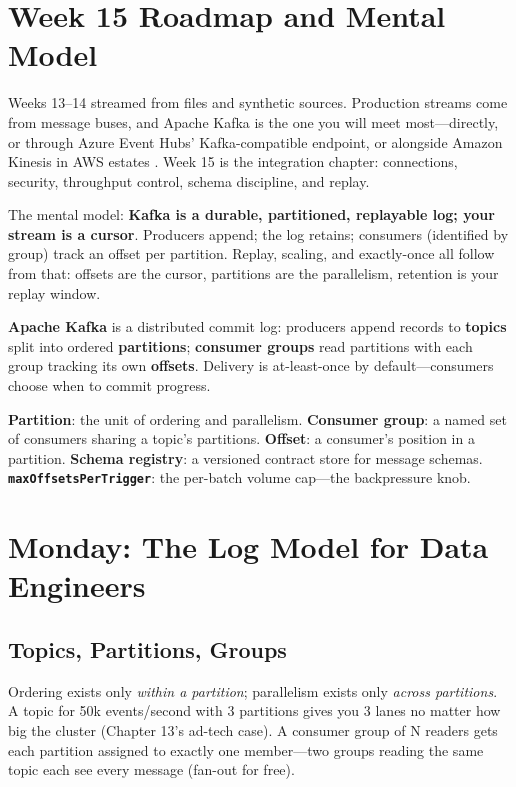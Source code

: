 \section{Week 15 Roadmap and Mental Model}
Weeks 13--14 streamed from files and synthetic sources. Production streams come from message buses, and Apache Kafka is the one you will meet most---directly, or through Azure Event Hubs' Kafka-compatible endpoint, or alongside Amazon Kinesis in AWS estates \cite{kafkaDocs,sparkKafkaIntegration}. Week 15 is the integration chapter: connections, security, throughput control, schema discipline, and replay.

The mental model: \textbf{Kafka is a durable, partitioned, replayable log; your stream is a cursor}. Producers append; the log retains; consumers (identified by group) track an offset per partition. Replay, scaling, and exactly-once all follow from that: offsets are the cursor, partitions are the parallelism, retention is your replay window.

\begin{definitionbox}
\textbf{Apache Kafka} is a distributed commit log: producers append records to \textbf{topics} split into ordered \textbf{partitions}; \textbf{consumer groups} read partitions with each group tracking its own \textbf{offsets}. Delivery is at-least-once by default---consumers choose when to commit progress.
\end{definitionbox}

\begin{keyterms}
\textbf{Partition}: the unit of ordering and parallelism. \textbf{Consumer group}: a named set of consumers sharing a topic's partitions. \textbf{Offset}: a consumer's position in a partition. \textbf{Schema registry}: a versioned contract store for message schemas. \textbf{\texttt{maxOffsetsPerTrigger}}: the per-batch volume cap---the backpressure knob.
\end{keyterms}

\section{Monday: The Log Model for Data Engineers}
\subsection{Topics, Partitions, Groups}
Ordering exists only \emph{within a partition}; parallelism exists only \emph{across partitions}. A topic for 50k events/second with 3 partitions gives you 3 lanes no matter how big the cluster (Chapter 13's ad-tech case). A consumer group of N readers gets each partition assigned to exactly one member---two groups reading the same topic each see every message (fan-out for free).

